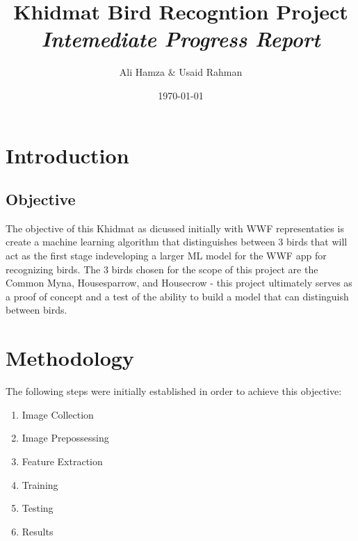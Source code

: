 \documentclass{article}
\title{Khidmat Bird Recogntion Project\\ \textit{Intemediate Progress Report}}
\author{Ali Hamza $\&$ Usaid Rahman}
\date{\today}
\begin{document}
    \maketitle
    \section*{Introduction}
    \subsection*{Objective}
    The objective of this Khidmat as dicussed initially with WWF representaties is create a machine learning algorithm that distinguishes between 3 birds that will act as the first stage indeveloping a larger ML model for the WWF app for recognizing birds. The 3 birds chosen for the scope of this project are the Common Myna, Housesparrow, and Housecrow - this project ultimately serves as a proof of concept and a test of the ability to build a model that can distinguish between birds.

    \section*{Methodology}
    The following steps were initially established in order to achieve this objective:
    
    \begin{enumerate}
        \item Image Collection
        \item Image Prepossessing
        \item Feature Extraction
        \item Training
        \item Testing
        \item Results
    \end{enumerate}
\end{document}
